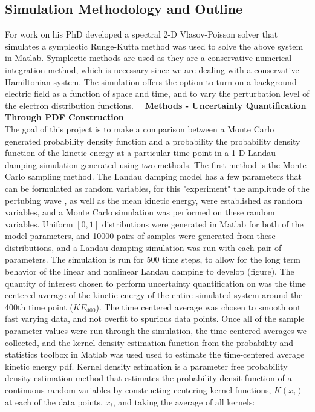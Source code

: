\documentclass{article}
\begin{document}
\subsection{Simulation Methodology and Outline}
For work on his PhD \cite{jacob_ameres_stochastic_2018}  developed a spectral 2-D Vlasov-Poisson solver that simulates  a symplectic Runge-Kutta method was used to solve the above system in Matlab. Symplectic methods are used as they are a conservative numerical integration method, which is necessary since we are dealing with a conservative Hamiltonian system. The simulation offers the option to turn on a background electric field as a function of space and time, and to vary the perturbation level of the electron distribution functions. \ \
\textbf{Methods - Uncertainty Quantification Through PDF Construction}\\
The goal of this project is to make a comparison between a Monte Carlo generated probability density function and a probability the probability density function of the kinetic energy at a particular time point in a 1-D Landau damping simulation generated using two methods. The first method is the Monte Carlo sampling method. The Landau damping model has a few parameters that can be formulated as random variables, for this "experiment" the amplitude of the pertubing wave , as well as the mean kinetic energy, were established as random variables, and a Monte Carlo simulation was performed on these random variables. Uniform $[0,1]$ distributions were generated in Matlab for both of the model parameters, and 10000 pairs of samples were generated from these distributions, and a Landau damping simulation was run with each pair of parameters. The simulation is run for 500 time steps, to allow for the long term behavior of the linear and nonlinear Landau damping to develop (figure). The quantity of interest chosen to perform uncertainty quantification on was the time centered average of the kinetic energy of the entire simulated system around the 400th time point ($KE_{400}$). The time centered average was chosen to smooth out fast varying data, and not overfit to spurious data points. Once all of the sample parameter values were run through the simulation, the time centered averages we collected, and the kernel density estimation function from the probability and statistics toolbox  in Matlab was used used to estimate the time-centered average kinetic energy pdf.  Kernel density estimation is a parameter free probability density estimation method that estimates the probability densit function of a continuous random variables by constructing centering kernel functions, $K(x_i)$ at each of the data points, $x_i$, and taking the average of all kernels:
\end{document}
